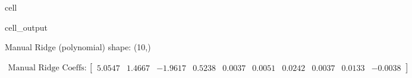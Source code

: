 \documentclass[letterpaper,10pt,english]{jupyterBook}
\begin{document}
\begin{sphinxuseclass}{cell}
\begin{sphinxVerbatimOutput}
\begin{sphinxuseclass}{cell_output}
\begin{sphinxVerbatim}[commandchars=\\\{\}]
Manual Ridge (polynomial) shape: (10,)
\end{sphinxVerbatim}
\begin{equation*}
\begin{split}\displaystyle \text{Manual Ridge Coeffs}:\left[
\begin{array}{}
  5.0547 &  1.4667 & -1.9617 &  0.5238 &  0.0037 &  0.0051 &  0.0242 &  0.0037 &  0.0133 & -0.0038
\end{array}
\right]\end{split}
\end{equation*}
\end{sphinxuseclass}\end{sphinxVerbatimOutput}

\end{sphinxuseclass}
\end{document}
